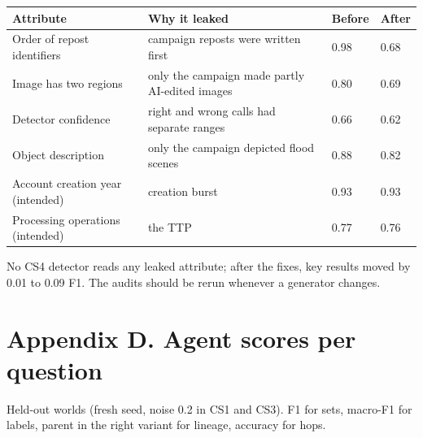 \documentclass[11pt]{article}
\begin{document}
\begingroup\small
\begin{xltabular}{\linewidth}{@{}>{\raggedright\arraybackslash{}\hsize}X>{\raggedright\arraybackslash{}\hsize}Xll@{}}
\toprule
\textbf{Attribute} & \textbf{Why it leaked} & \textbf{Before} & \textbf{After} \\
\midrule
\endhead
Order of repost identifiers & campaign reposts were written first & 0.98 & 0.68 \\
Image has two regions & only the campaign made partly AI-edited images & 0.80 & 0.69 \\
Detector confidence & right and wrong calls had separate ranges & 0.66 & 0.62 \\
Object description & only the campaign depicted flood scenes & 0.88 & 0.82 \\
Account creation year (intended) & creation burst & 0.93 & 0.93 \\
Processing operations (intended) & the TTP & 0.77 & 0.76 \\
\bottomrule
\end{xltabular}
\endgroup

No CS4 detector reads any leaked attribute; after the fixes, key results moved by 0.01 to 0.09 F1. The audits should be rerun whenever a generator changes.

\section*{Appendix D. Agent scores per question}
Held-out worlds (fresh seed, noise 0.2 in CS1 and CS3). F1 for sets, macro-F1 for labels, parent in the right variant for lineage, accuracy for hops.
\end{document}
